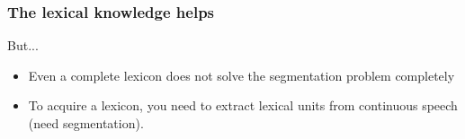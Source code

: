 \begin{frame}
\frametitle{The lexical knowledge helps}
But...
\begin{itemize}
\item Even a complete lexicon does not solve the segmentation problem
      completely
\item<3-> To acquire a lexicon, you need to extract lexical units from
          continuous speech (need segmentation).
\end{itemize}
\begin{center}
\end{center}
\end{frame}
